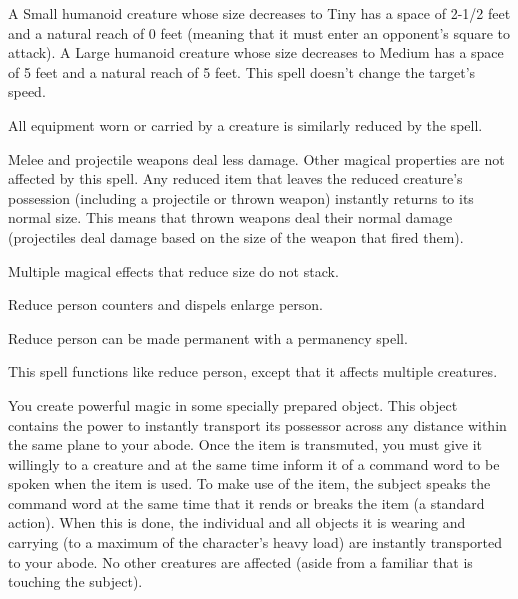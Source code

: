 \begin{multicols}{2}
\begin{small}
\smallskip\noindent A Small humanoid creature whose size decreases to Tiny has a space of 2-1/2 feet and a natural reach of 0 feet (meaning that it must enter an opponent's square to attack). A Large humanoid creature whose size decreases to Medium has a space of 5 feet and a natural reach of 5 feet. This spell doesn't change the target's speed.

\smallskip\noindent All equipment worn or carried by a creature is similarly reduced by the spell.

\smallskip\noindent Melee and projectile weapons deal less damage. Other magical properties are not affected by this spell. Any reduced item that leaves the reduced creature's possession (including a projectile or thrown weapon) instantly returns to its normal size. This means that thrown weapons deal their normal damage (projectiles deal damage based on the size of the weapon that fired them).

\smallskip\noindent Multiple magical effects that reduce size do not stack.

\smallskip\noindent Reduce person counters and dispels enlarge person.

\smallskip\noindent Reduce person can be made permanent with a permanency spell.


\noindent This spell functions like reduce person, except that it affects multiple creatures.

\noindent You create powerful magic in some specially prepared object. This object contains the power to instantly transport its possessor across any distance within the same plane to your abode. Once the item is transmuted, you must give it willingly to a creature and at the same time inform it of a command word to be spoken when the item is used. To make use of the item, the subject speaks the command word at the same time that it rends or breaks the item (a standard action). When this is done, the individual and all objects it is wearing and carrying (to a maximum of the character's heavy load) are instantly transported to your abode. No other creatures are affected (aside from a familiar that is touching the subject).


\end{small}
\end{multicols}
